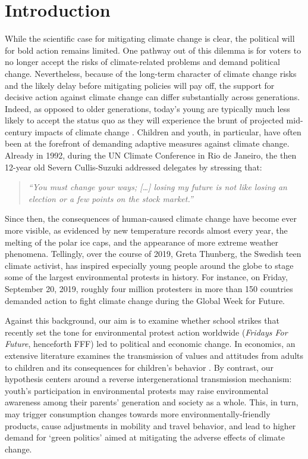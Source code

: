 

\section{Introduction}\label{sec_greta_cons:intro}

While the scientific case for mitigating climate change is clear, the political will for bold action remains limited. One pathway out of this dilemma is for voters to no longer accept the risks of climate-related problems and demand political change. Nevertheless, because of the long-term character of climate change risks and the likely delay before mitigating policies will pay off, the support for decisive action against climate change can differ substantially across generations. Indeed, as opposed to older generations, today's young are typically much less likely to accept the status quo as they will experience the brunt of projected mid-century impacts of climate change \citep{hersch2006generational}. Children and youth, in particular, have often been at the forefront of demanding adaptive measures against climate change. Already in 1992, during the UN Climate Conference in Rio de Janeiro, the then 12-year old Severn Cullis-Suzuki addressed delegates by stressing that: 
\begin{quote}
	\textit{``You must change your ways; […] losing my future is not like losing an election or a few points on the stock market.''}
\end{quote}
Since then, the consequences of human-caused climate change have become ever more visible, as evidenced by new temperature records almost every year, the melting of the polar ice caps, and the appearance of more extreme weather phenomena. Tellingly, over the course of 2019, Greta Thunberg, the Swedish teen climate activist, has inspired especially young people around the globe to stage some of the largest environmental protests in history. For instance, on Friday, September 20, 2019, roughly four million protesters in more than 150 countries demanded action to fight climate change during the Global Week for Future. 


Against this background, our aim is to examine whether school strikes that recently set the tone for environmental protest action worldwide (\textit{Fridays For Future}, henceforth FFF) led to political and economic change. In economics, an extensive literature examines the transmission of values and attitudes from adults to children and its consequences for children's behavior \citep{bisin2001economics,figlio2019longterm}. By contrast, our hypothesis centers around a reverse intergenerational transmission mechanism: youth's participation in environmental protests may raise environmental awareness among their parents' generation and society as a whole. This, in turn, may trigger consumption changes towards more environmentally-friendly products, cause adjustments in mobility and travel behavior, and lead to higher demand for `green politics' aimed at mitigating the adverse effects of climate change. 

